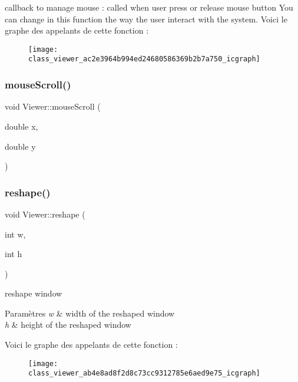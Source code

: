 callback to manage mouse \+: called when user press or release mouse button You can change in this function the way the user interact with the system. Voici le graphe des appelants de cette fonction \+:\nopagebreak
\begin{figure}[H]
\begin{center}
\leavevmode
\texttt{[image: class\_viewer\_ac2e3964b994ed24680586369b2b7a750\_icgraph]}
\end{center}
\end{figure}
\mbox{\label{class_viewer_abd042d0aa5ae88ef0261d83c15ce8d4b}} 
\subsubsection{\texorpdfstring{mouse\+Scroll()}{mouseScroll()}}
{\footnotesize\ttfamily void Viewer\+::mouse\+Scroll (\begin{DoxyParamCaption}\item[{double}]{x,  }\item[{double}]{y }\end{DoxyParamCaption})}

\mbox{\label{class_viewer_ab4e8ad8f2d8c73cc9312785e6aed9e75}} 
\subsubsection{\texorpdfstring{reshape()}{reshape()}}
{\footnotesize\ttfamily void Viewer\+::reshape (\begin{DoxyParamCaption}\item[{int}]{w,  }\item[{int}]{h }\end{DoxyParamCaption})}



reshape window 


\begin{DoxyParams}{Paramètres}
{\em w} & width of the reshaped window \\
\hline
{\em h} & height of the reshaped window \\
\hline
\end{DoxyParams}
Voici le graphe des appelants de cette fonction \+:\nopagebreak
\begin{figure}[H]
\begin{center}
\leavevmode
\texttt{[image: class\_viewer\_ab4e8ad8f2d8c73cc9312785e6aed9e75\_icgraph]}
\end{center}
\end{figure}
\mbox{\label{class_viewer_a7deac2bd87e6c5a76c6eb600306d6096}} 
